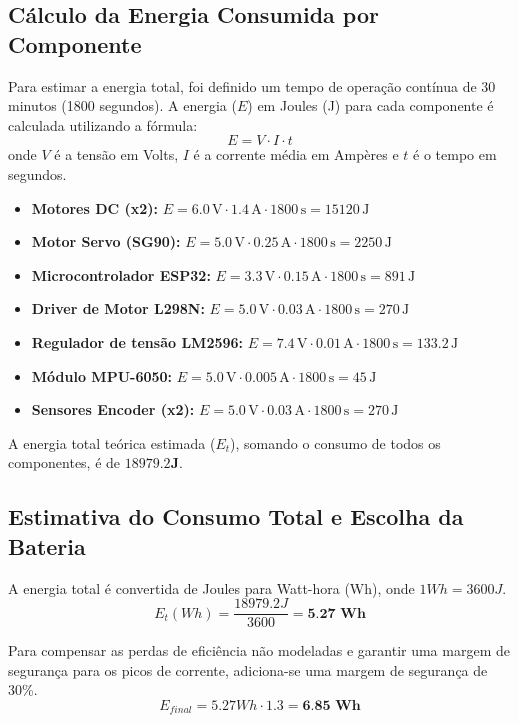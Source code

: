 \subsection{Cálculo da Energia Consumida por Componente}
Para estimar a energia total, foi definido um tempo de operação contínua de 30 minutos (1800 segundos). A energia ($E$) em Joules (J) para cada componente é calculada utilizando a fórmula:
\begin{equation}
    E = V \cdot I \cdot t
\end{equation}
onde $V$ é a tensão em Volts, $I$ é a corrente média em Ampères e $t$ é o tempo em segundos.

\begin{itemize}
    \item \textbf{Motores DC (x2):} $E = 6.0\,\text{V} \cdot 1.4\,\text{A} \cdot 1800\,\text{s} = 15120\,\text{J}$
    \item \textbf{Motor Servo (SG90):} $E = 5.0\,\text{V} \cdot 0.25\,\text{A} \cdot 1800\,\text{s} = 2250\,\text{J}$
    \item \textbf{Microcontrolador ESP32:} $E = 3.3\,\text{V} \cdot 0.15\,\text{A} \cdot 1800\,\text{s} = 891\,\text{J}$
    \item \textbf{Driver de Motor L298N:} $E = 5.0\,\text{V} \cdot 0.03\,\text{A} \cdot 1800\,\text{s} = 270\,\text{J}$
    \item \textbf{Regulador de tensão LM2596:} $E = 7.4\,\text{V} \cdot 0.01\,\text{A} \cdot 1800\,\text{s} = 133.2\,\text{J}$
    \item \textbf{Módulo MPU-6050:} $E = 5.0\,\text{V} \cdot 0.005\,\text{A} \cdot 1800\,\text{s} = 45\,\text{J}$
    \item \textbf{Sensores Encoder (x2):} $E = 5.0\,\text{V} \cdot 0.03\,\text{A} \cdot 1800\,\text{s} = 270\,\text{J}$
\end{itemize}

A energia total teórica estimada ($E_t$), somando o consumo de todos os componentes, é de $\mathbf{18979.2 J}$.

\subsection{Estimativa do Consumo Total e Escolha da Bateria}

A energia total é convertida de Joules para Watt-hora (Wh), onde $1 Wh = 3600 J$.
$$ E_t (Wh) = \frac{18979.2 J}{3600} = \textbf{5.27 Wh} $$

Para compensar as perdas de eficiência não modeladas e garantir uma margem de segurança para os picos de corrente, adiciona-se uma margem de segurança de 30\%.
$$ E_{final} = 5.27 Wh \cdot 1.3 = \textbf{6.85 Wh} $$

